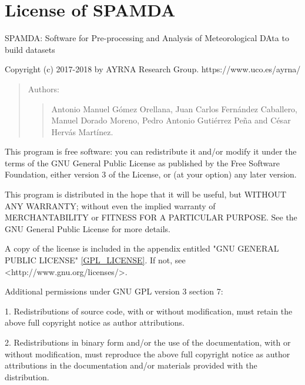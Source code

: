 \chapter{License of SPAMDA} \label{licenseGPLSPAMDA}

\parindent=0pt

\small

SPAMDA: Software for Pre-processing and Analysis of Meteorological DAta to build datasets

Copyright (c) 2017-2018 by AYRNA Research Group. https://www.uco.es/ayrna/
	\begin{quote}
	Authors: 
		\begin{quote}
			Antonio Manuel Gómez Orellana, Juan Carlos Fernández Caballero,
			Manuel Dorado Moreno, Pedro Antonio Gutiérrez Peña and 
			César Hervás Martínez.
		\end{quote}
	\end{quote}

This program is free software: you can redistribute it and/or modify it under the
terms of the GNU General Public License as published by the Free Software Foundation,
either version 3 of the License, or (at your option) any later version.

This program is distributed in the hope that it will be useful, but WITHOUT ANY WARRANTY;
without even the implied warranty of MERCHANTABILITY or FITNESS FOR A PARTICULAR PURPOSE.
See the GNU General Public License for more details.

A copy of the license is included in the appendix entitled "GNU GENERAL PUBLIC LICENSE" \ref{GPL_LICENSE}.
If not, see <http://www.gnu.org/licenses/>.

Additional permissions under GNU GPL version 3 section 7:

1. Redistributions of source code, with or without modification, must retain
the above full copyright notice as author attributions.

2. Redistributions in binary form and/or the use of the documentation,
with or without modification, must reproduce the above full copyright notice
as author attributions in the documentation and/or materials provided with
the distribution.


